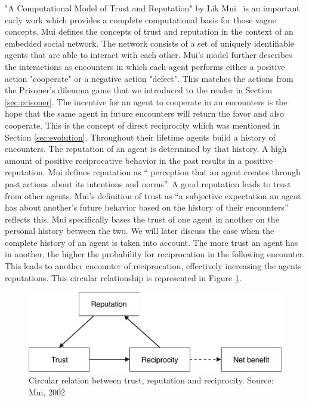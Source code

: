 "A Computational Model of Trust and Reputation" by Lik Mui~\cite{mui2002computational} is an
important early work which provides a complete computational basis for those vague concepts. Mui
defines the concepts of trust and reputation in the context of an embedded social network. The 
network consists of a set of uniquely identifiable agents that are able to interact with each other. 
Mui's model further describes the interactions as encounters in which each agent performs either a 
positive action "cooperate" or a negative action "defect". This matches the actions from the 
Prisoner's dilemma game that we introduced to the reader in Section \ref{sec:prisoner}. The incentive
for an agent to cooperate in an encounters is the hope that the same agent in future encounters will
return the favor and also cooperate. This is the concept of direct reciprocity which was
mentioned in Section \ref{sec:evolution}. Throughout their lifetime agents build a
history of encounters. The reputation of an agent is determined by that history. A high amount of 
positive reciprocative behavior in the past results in a positive reputation. Mui defines reputation as ``
perception that an agent creates through past actions about its intentions and norms''. A good 
reputation leads to trust from other agents. Mui's definition of trust as ``a subjective expectation
an agent has about another's future behavior based on the history of their encounters'' reflects
this. Mui specifically bases the trust of one agent in another on the personal history between the
two. We will later discuss the case when the complete history of an agent is taken into account. The
more trust an agent has in another, the higher the probability for reciprocation in the following
encounter. This leads to another encounter of reciprocation, effectively increasing the agents 
reputations. This circular relationship is represented in Figure \ref{fig:mui}. 


\begin{figure}[h!]
    \centering
    \includegraphics[width=\textwidth]{images/mui_figure}
    \caption{Circular relation between trust, reputation and reciprocity. Source: Mui, 2002~\cite{mui2002computational}}
    \label{fig:mui}
\end{figure}


